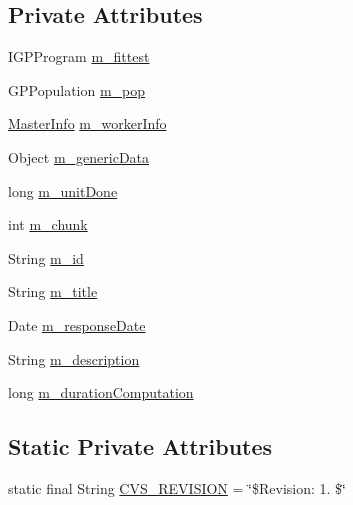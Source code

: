 \subsection*{Private Attributes}
\begin{DoxyCompactItemize}
\item 
I\-G\-P\-Program \hyperlink{classorg_1_1jgap_1_1distr_1_1grid_1_1gp_1_1_j_g_a_p_result_g_p_a778660c9e78b772b7471b4635555bfc8}{m\-\_\-fittest}
\item 
G\-P\-Population \hyperlink{classorg_1_1jgap_1_1distr_1_1grid_1_1gp_1_1_j_g_a_p_result_g_p_a502d518ac6ca27f3b3c9dfc74b9181bb}{m\-\_\-pop}
\item 
\hyperlink{classorg_1_1jgap_1_1distr_1_1_master_info}{Master\-Info} \hyperlink{classorg_1_1jgap_1_1distr_1_1grid_1_1gp_1_1_j_g_a_p_result_g_p_a3c9a9cf7dbe280925746aa02cf89e488}{m\-\_\-worker\-Info}
\item 
Object \hyperlink{classorg_1_1jgap_1_1distr_1_1grid_1_1gp_1_1_j_g_a_p_result_g_p_acbf328c451633bd794bad68c3cc2fb9b}{m\-\_\-generic\-Data}
\item 
long \hyperlink{classorg_1_1jgap_1_1distr_1_1grid_1_1gp_1_1_j_g_a_p_result_g_p_a90e49128a780de5ea93cbfa6df929c60}{m\-\_\-unit\-Done}
\item 
int \hyperlink{classorg_1_1jgap_1_1distr_1_1grid_1_1gp_1_1_j_g_a_p_result_g_p_a2c3e58a5c76be22b4b89951a5bf5556a}{m\-\_\-chunk}
\item 
String \hyperlink{classorg_1_1jgap_1_1distr_1_1grid_1_1gp_1_1_j_g_a_p_result_g_p_ac524027057f8527767293b850f8b6e8d}{m\-\_\-id}
\item 
String \hyperlink{classorg_1_1jgap_1_1distr_1_1grid_1_1gp_1_1_j_g_a_p_result_g_p_aed31a32095b711634273415dafc752f3}{m\-\_\-title}
\item 
Date \hyperlink{classorg_1_1jgap_1_1distr_1_1grid_1_1gp_1_1_j_g_a_p_result_g_p_a323727b73a3aa26b8b1fd0b51269fe4c}{m\-\_\-response\-Date}
\item 
String \hyperlink{classorg_1_1jgap_1_1distr_1_1grid_1_1gp_1_1_j_g_a_p_result_g_p_a9dd8a68da95efde6d9dad8b56d96de98}{m\-\_\-description}
\item 
long \hyperlink{classorg_1_1jgap_1_1distr_1_1grid_1_1gp_1_1_j_g_a_p_result_g_p_a2fbabfb862da0868834432404b132fe7}{m\-\_\-duration\-Computation}
\end{DoxyCompactItemize}
\subsection*{Static Private Attributes}
\begin{DoxyCompactItemize}
\item 
static final String \hyperlink{classorg_1_1jgap_1_1distr_1_1grid_1_1gp_1_1_j_g_a_p_result_g_p_afded3dd921b10ee6ba1e1b4d64762f66}{C\-V\-S\-\_\-\-R\-E\-V\-I\-S\-I\-O\-N} = \char`\"{}\$Revision\-: 1. \$\char`\"{}
\end{DoxyCompactItemize}


